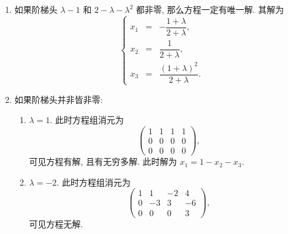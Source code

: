\begin{enumerate}
    \item 如果阶梯头 $\lambda - 1$ 和 $2 - \lambda - \lambda^2$ 都非零, 那么方程一定有唯一解. 其解为
\[
    \left\{
    \begin{alignedat}{2}
    x_1 &{}= & -\dfrac{1 + \lambda}{2 + \lambda}, \\
    x_2 &{}= & \dfrac{1}{2 + \lambda}, \\
    x_3 &{}= & \dfrac{(1 + \lambda)^2}{2 + \lambda}.
    \end{alignedat}
    \right.
\]
    \item 如果阶梯头并非皆非零:
    \begin{enumerate}
        \item $\lambda = 1$. 此时方程组消元为
        \[
        \left(
        \begin{array}{ccc|c}
            1 & 1 & 1 & 1 \\
            0 & 0 & 0 & 0 \\
            0 & 0 & 0 & 0
        \end{array}
        \right),
        \]
        可见方程有解, 且有无穷多解. 此时解为 $x_1 = 1 - x_2 - x_3$.
        \item $\lambda = -2$. 此时方程组消元为
        \[
        \left(
        \begin{array}{ccc|c}
            1 & 1 & -2 & 4 \\
            0 & -3 & 3 & -6 \\
            0 & 0 & 0 & 3
        \end{array}
        \right),
        \]
        可见方程无解.
    \end{enumerate}
\end{enumerate}